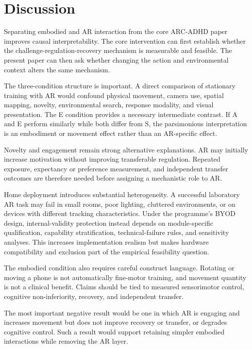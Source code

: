 \section{Discussion}

Separating embodied and AR interaction from the core ARC-ADHD paper improves causal interpretability. The core intervention can first establish whether the challenge-regulation-recovery mechanism is measurable and feasible. The present paper can then ask whether changing the action and environmental context alters the same mechanism.

The three-condition structure is important. A direct comparison of stationary training with AR would confound physical movement, camera use, spatial mapping, novelty, environmental search, response modality, and visual presentation. The E condition provides a necessary intermediate contrast. If A and E perform similarly while both differ from S, the parsimonious interpretation is an embodiment or movement effect rather than an AR-specific effect.

Novelty and engagement remain strong alternative explanations. AR may initially increase motivation without improving transferable regulation. Repeated exposure, expectancy or preference measurement, and independent transfer outcomes are therefore needed before assigning a mechanistic role to AR.

Home deployment introduces substantial heterogeneity. A successful laboratory AR task may fail in small rooms, poor lighting, cluttered environments, or on devices with different tracking characteristics. Under the programme's BYOD design, internal-validity protection instead depends on module-specific qualification, capability stratification, technical-failure rules, and sensitivity analyses. This increases implementation realism but makes hardware compatibility and exclusion part of the empirical feasibility question.

The embodied condition also requires careful construct language. Rotating or moving a phone is not automatically fine-motor training, and movement quantity is not a clinical benefit. Claims should be tied to measured sensorimotor control, cognitive non-inferiority, recovery, and independent transfer.

The most important negative result would be one in which AR is engaging and increases movement but does not improve recovery or transfer, or degrades cognitive control. Such a result would support retaining simpler embodied interactions while removing the AR layer.
